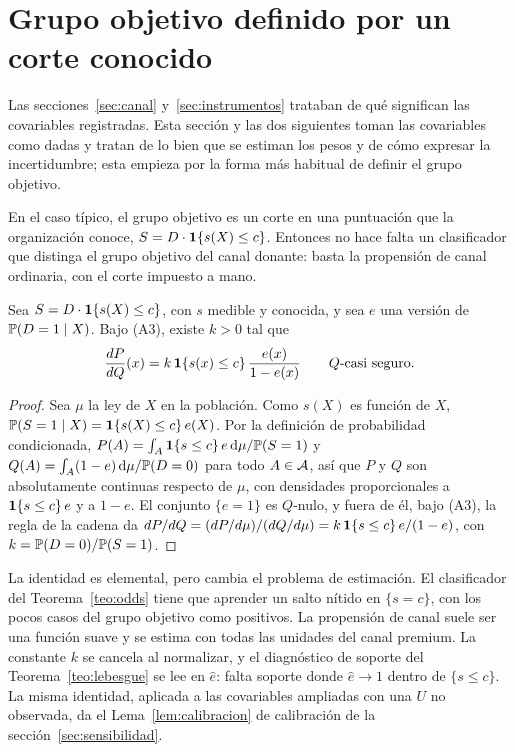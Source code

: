 \section{Grupo objetivo definido por un corte conocido}\label{sec:corte}

Las secciones~\ref{sec:canal} y~\ref{sec:instrumentos} trataban de qué significan las covariables registradas. Esta sección y las dos siguientes toman las covariables como dadas y tratan de lo bien que se estiman los pesos y de cómo expresar la incertidumbre; esta empieza por la forma más habitual de definir el grupo objetivo.

En el caso típico, el grupo objetivo es un corte en una puntuación que la organización conoce, $S=D\cdot\mathbf{1}\{s(X)\le c\}$. Entonces no hace falta un clasificador que distinga el grupo objetivo del canal donante: basta la propensión de canal ordinaria, con el corte impuesto a mano.

\begin{proposicion}\label{prop:corte}
Sea $S=D\cdot\mathbf{1}\{s(X)\le c\}$, con $s$ medible y conocida, y sea $e$ una versión de $\mathbb{P}(D=1\mid X)$. Bajo (A3), existe $k>0$ tal que
\[
\frac{dP}{dQ}(x)=k\,\mathbf{1}\{s(x)\le c\}\,\frac{e(x)}{1-e(x)}\qquad Q\text{-casi seguro.}
\]
\end{proposicion}
\begin{proof}
Sea $\mu$ la ley de $X$ en la población. Como $s(X)$ es función de $X$, $\mathbb{P}(S=1\mid X)=\mathbf{1}\{s(X)\le c\}\,e(X)$. Por la definición de probabilidad condicionada, $P(A)=\int_A\mathbf{1}\{s\le c\}\,e\,\mathrm{d}\mu/\mathbb{P}(S=1)$ y $Q(A)=\int_A(1-e)\,\mathrm{d}\mu/\mathbb{P}(D=0)$ para todo $A\in\mathcal{A}$, así que $P$ y $Q$ son absolutamente continuas respecto de $\mu$, con densidades proporcionales a $\mathbf{1}\{s\le c\}\,e$ y a $1-e$. El conjunto $\{e=1\}$ es $Q$-nulo, y fuera de él, bajo (A3), la regla de la cadena da $dP/dQ=(dP/d\mu)/(dQ/d\mu)=k\,\mathbf{1}\{s\le c\}\,e/(1-e)$, con $k=\mathbb{P}(D=0)/\mathbb{P}(S=1)$.
\end{proof}

La identidad es elemental, pero cambia el problema de estimación. El clasificador del Teorema~\ref{teo:odds} tiene que aprender un salto nítido en $\{s=c\}$, con los pocos casos del grupo objetivo como positivos. La propensión de canal suele ser una función suave y se estima con todas las unidades del canal premium. La constante $k$ se cancela al normalizar, y el diagnóstico de soporte del Teorema~\ref{teo:lebesgue} se lee en $\hat e$: falta soporte donde $\hat e\to1$ dentro de $\{s\le c\}$. La misma identidad, aplicada a las covariables ampliadas con una $U$ no observada, da el Lema~\ref{lem:calibracion} de calibración de la sección~\ref{sec:sensibilidad}.

